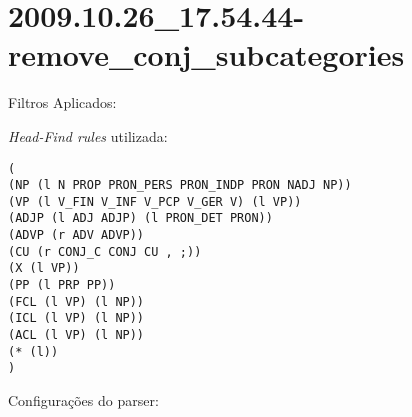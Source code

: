 \section{2009.10.26_17.54.44-remove_conj_subcategories} %
\label{sec:exp:2009.10.26_17.54.44-remove_conj_subcategories}

Filtros Aplicados:

\begin{itemize}
  
  \item{\emph{RemoveConjSubcategories}
  
\end{itemize}

\emph{Head-Find rules} utilizada:

\scriptsize
\begin{verbatim}
(
(NP (l N PROP PRON_PERS PRON_INDP PRON NADJ NP))
(VP (l V_FIN V_INF V_PCP V_GER V) (l VP))
(ADJP (l ADJ ADJP) (l PRON_DET PRON))
(ADVP (r ADV ADVP))
(CU (r CONJ_C CONJ CU , ;))
(X (l VP))
(PP (l PRP PP))
(FCL (l VP) (l NP))
(ICL (l VP) (l NP))
(ACL (l VP) (l NP))
(* (l))
)

\end{verbatim}

\normalsize

Configurações do parser:

